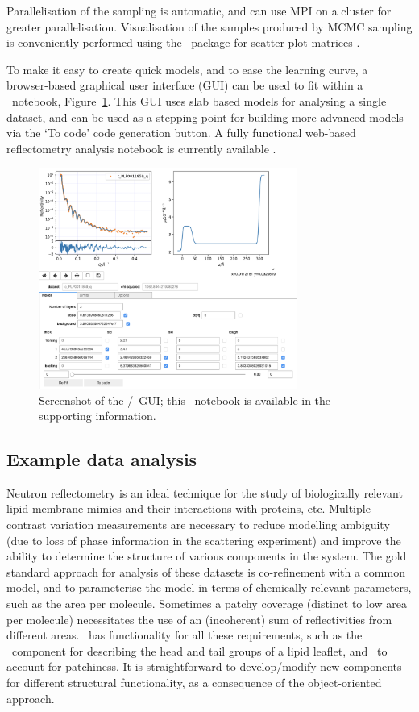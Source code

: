 \documentclass[pdf,preprint]{iucr}
\begin{document}
Parallelisation of the sampling is automatic, and can use MPI on a cluster for greater parallelisation. Visualisation of the samples produced by MCMC sampling is conveniently performed using the \corner\ package for scatter plot matrices \cite{corner}.

To make it easy to create quick models, and to ease the learning curve, a browser-based graphical user interface (GUI) \cite{ipywidgets} can be used to fit within a \Jupyter\ notebook, Figure~\ref{fig:gui}. This GUI uses slab based models for analysing a single dataset, and can be used as a stepping point for building more advanced models via the `To code' code generation button. A fully functional web-based reflectometry analysis notebook is currently available \cite{Nelson2018}. 

\begin{figure}
  \includegraphics[width=85mm]{./supporting_information/gui.png}
  \caption{Screenshot of the \Jupyter/\ipywidgets\ GUI; this \Jupyter\ notebook is available in the supporting information.}
  \label{fig:gui}
\end{figure}

\subsection{Example data analysis}

Neutron reflectometry is an ideal technique for the study of biologically relevant lipid membrane mimics and their interactions with proteins, etc. Multiple contrast variation measurements are necessary to reduce modelling ambiguity (due to loss of phase information in the scattering experiment) and improve the ability to determine the structure of various components in the system. The gold standard approach for analysis of these datasets is co-refinement with a common model, and to parameterise the model in terms of chemically relevant parameters, such as the area per molecule. Sometimes a patchy coverage (distinct to low area per molecule) necessitates the use of an (incoherent) sum of reflectivities from different areas. \ has functionality for all these requirements, such as the \LipidLeaflet\ component for describing the head and tail groups of a lipid leaflet, and \MixedReflectModel\ to account for patchiness. It is straightforward to develop/modify new components for different structural functionality, as a consequence of the object-oriented approach.
\end{document}
